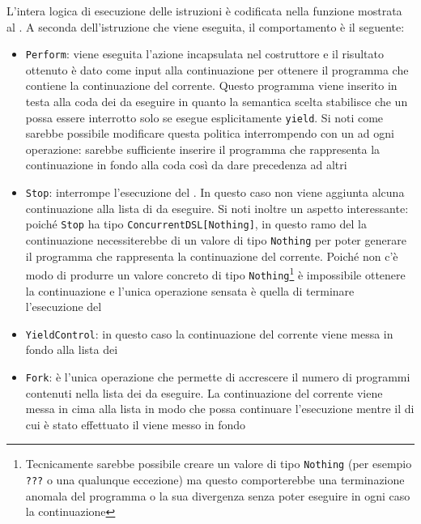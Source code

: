 L'intera logica di esecuzione delle istruzioni è codificata nella funzione mostrata al .
A seconda dell'istruzione che viene eseguita, il comportamento è il seguente:
\begin{itemize}
  \item \lstinline{Perform}: viene eseguita l'azione incapsulata nel costruttore e il risultato ottenuto è dato come input alla continuazione per ottenere il programma che contiene la continuazione del  corrente. Questo programma viene inserito in testa alla coda dei  da eseguire in quanto la semantica scelta stabilisce che un  possa essere interrotto solo se esegue esplicitamente \lstinline{yield}. Si noti come sarebbe possibile modificare questa politica interrompendo con  un  ad ogni operazione: sarebbe sufficiente inserire il programma che rappresenta la continuazione in fondo alla coda così da dare precedenza ad altri 
  \item \lstinline{Stop}: interrompe l'esecuzione del . In questo caso non viene aggiunta alcuna continuazione alla lista di  da eseguire. Si noti inoltre un aspetto interessante: poiché \lstinline{Stop} ha tipo \lstinline{ConcurrentDSL[Nothing]}, in questo ramo del  la continuazione necessiterebbe di un valore di tipo \lstinline{Nothing} per poter generare il programma che rappresenta la continuazione del  corrente. Poiché non c'è modo di produrre un valore concreto di tipo \lstinline{Nothing}\footnote{Tecnicamente sarebbe possibile creare un valore di tipo \lstinline{Nothing} (per esempio \lstinline{???} o una qualunque eccezione) ma questo comporterebbe una terminazione anomala del programma o la sua divergenza senza poter eseguire in ogni caso la continuazione} è impossibile ottenere la continuazione e l'unica operazione sensata è quella di terminare l'esecuzione del 
  \item \lstinline{YieldControl}: in questo caso la continuazione del  corrente viene messa in fondo alla lista dei 
  \item \lstinline{Fork}: è l'unica operazione che permette di accrescere il numero di programmi contenuti nella lista dei  da eseguire. La continuazione del  corrente viene messa in cima alla lista in modo che possa continuare l'esecuzione mentre il  di cui è stato effettuato il  viene messo in fondo
\end{itemize}

